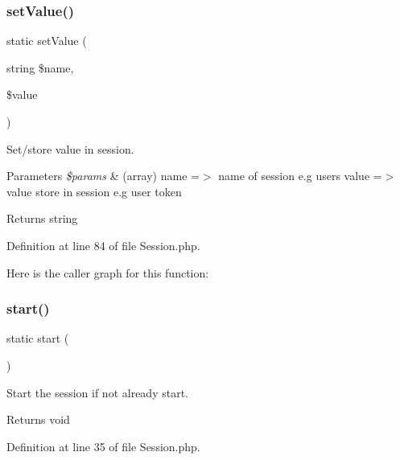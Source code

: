 \subsubsection{\texorpdfstring{set\+Value()}{setValue()}}
{\footnotesize\ttfamily static set\+Value (\begin{DoxyParamCaption}\item[{string}]{\$name,  }\item[{}]{\$value }\end{DoxyParamCaption})\hspace{0.3cm}{\ttfamily [static]}}

Set/store value in session.


\begin{DoxyParams}{Parameters}
{\em \$params} & (array) \textquotesingle{}name\textquotesingle{} =$>$ name of session e.\+g users \textquotesingle{}value\textquotesingle{} =$>$ value store in session e.\+g user token\\
\hline
\end{DoxyParams}
\begin{DoxyReturn}{Returns}
string 
\end{DoxyReturn}


Definition at line 84 of file Session.\+php.

Here is the caller graph for this function\+:
\mbox{\label{class_zest_1_1_session_1_1_session_a146085d0f3a9d17bdcd7f3d4081d8c0d}} 
\subsubsection{\texorpdfstring{start()}{start()}}
{\footnotesize\ttfamily static start (\begin{DoxyParamCaption}{ }\end{DoxyParamCaption})\hspace{0.3cm}{\ttfamily [static]}}

Start the session if not already start.

\begin{DoxyReturn}{Returns}
void 
\end{DoxyReturn}


Definition at line 35 of file Session.\+php.

\mbox{\label{class_zest_1_1_session_1_1_session_aaea4a8cdb751723a388c9d8df2c374f6}} 
